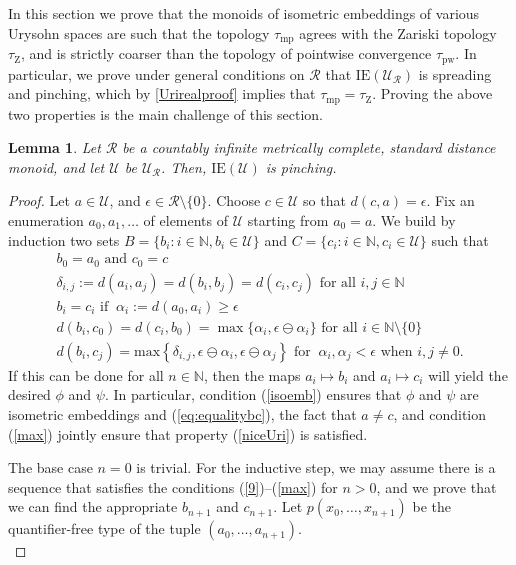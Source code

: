 \documentclass{article}
\newtheorem{lemma}[theorem]{Lemma}
\theoremstyle{remark}
\theoremstyle{definition}
\newcommand{\U}[0]{\mathbb{U}}
\renewcommand{\U}[0]{\mathcal{U}}
\newcommand{\pw}[0]{\tau_{\mathrm{pw}}}
\newcommand{\zar}[0]{\tau_{\mathrm{Z}}}
\newcommand{\mpw}[0]{\tau_{\mathrm{mp}}}
\renewcommand\geq{\geqslant}
\newcommand{\rr}[0]{\mathcal{R}}
\newcommand{\ie}[0]{\mathrm{IE}}
\begin{document}
{{{{{In this section we prove that the monoids of isometric embeddings of various Urysohn spaces are such that the topology $\mpw$ agrees with the Zariski topology $\zar$, and is strictly coarser than the topology of pointwise convergence $\pw$. In particular, we prove under general conditions on $\rr$ that $\ie(\U_{\rr})$ is spreading and pinching, which by \cref{Urirealproof} implies that $\mpw=\zar$. Proving the above two properties is the main challenge of this section. 



\begin{lemma}\label{Urilemma1}  Let $\rr$ be a countably infinite metrically complete, standard distance monoid, and let $\U$ be $\U_\rr$. Then, $\ie(\U)$ is pinching.  
\end{lemma}
\begin{proof} 
 
{Let $a\in\U$, and  $\epsilon\in \rr\setminus\{0\}$.} 
 Choose $c\in \U$ so that $d(c,a)=\epsilon$. Fix an  enumeration $a_0, a_1, \dots$ of elements of $\U$ starting from $a_0=a$. We build by induction two sets $B=\{b_i:i\in \mathbb N, b_i\in \U\}$ and $C=\{c_i:i\in \mathbb N, c_i\in \U\}$ such that
\begin{align}
b_0=a_0 \mbox{ and } c_0=c \label{9}\\
    \delta_{i,j}:=d(a_i, a_j)=d(b_i, b_j)=d(c_i, c_j)\label{isoemb} \text{ for all } i,j\in \mathbb N\\
     b_i=c_i \text{ if }\ \alpha_i:=d(a_0, a_i)\geq \epsilon \label{eq:equalitybc}\\ d(b_i,c_0)=d(c_i,b_0)=\max\{\alpha_i, \epsilon\ominus\alpha_i\} \text{ for all } i\in \mathbb N\setminus\{0\} \label{withzero}\\
     d(b_i, c_j)=\mathrm{max}\left\{\delta_{i,j}, \epsilon\ominus\alpha_i, \epsilon\ominus\alpha_j\right\} \text{ for }\ \alpha_i,\alpha_j< \epsilon \text{ when } i,j\neq 0 
     .\label{max}
\end{align}
If this can be done for all $n\in \mathbb N$, then the maps $a_i\mapsto b_i$ and $a_i\mapsto c_i$ will yield the desired $\phi$ and $\psi$. In particular, condition (\ref{isoemb}) ensures that $\phi$ and $\psi$ are isometric embeddings and (\ref{eq:equalitybc}), the fact that $a\neq c$, and condition (\ref{max}) jointly ensure that property (\ref{niceUri}) is satisfied.

The base case $n=0$ is trivial. For the inductive step, we may assume there is a sequence that satisfies the conditions (\ref{9})--(\ref{max}) for $n>0$, and we prove that we can find the appropriate $b_{n+1}$ and $c_{n+1}$. Let $p(x_0, \dots, x_{n+1})$
{be the quantifier-free type of the tuple $(a_0, \dots, a_{n+1})$.}\\



\end{proof}}}}}}
\end{document}
